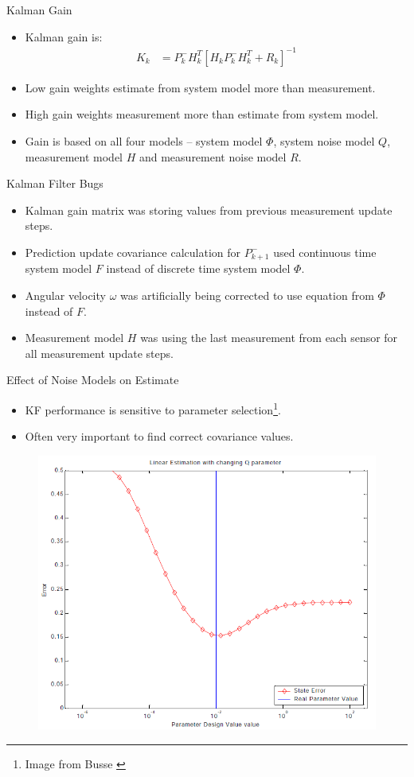 \documentclass[hyperref={pdfpagelabels=false}]{beamer}
\begin{document}
\begin{frame}{Kalman Gain}
\begin{itemize}
\item Kalman gain is:
\begin{align*}
K_k &= P_k^-H_k^T\left[H_kP_k^-H_k^T + R_k\right]^{-1}
\end{align*}
\item Low gain weights estimate from system model more than measurement.
\item High gain weights measurement more than estimate from system model.
\item Gain is based on all four models -- system model $\Phi$, system noise model $Q$, measurement model $H$ and measurement noise model $R$.
\end{itemize}
\end{frame}

\begin{frame}{Kalman Filter Bugs}
\begin{itemize}
\item Kalman gain matrix was storing values from previous measurement update steps.
\item Prediction update covariance calculation for $P_{k+1}^-$ used continuous time system model $F$ instead of discrete time system model $\Phi$.
\item Angular velocity $\omega$ was artificially being corrected to use equation from $\Phi$ instead of $F$.
\item Measurement model $H$ was using the last measurement from each sensor for all measurement update steps.
\end{itemize}
\end{frame}

\begin{frame}{Effect of Noise Models on Estimate}
\begin{itemize}
\item KF performance is sensitive to parameter selection\footnote{Image from Busse \cite{Busse03adaptiveEKF}}.
\item Often very important to find correct covariance values.
\end{itemize}
\begin{figure}[ht!]
	\centering
	\includegraphics[width=.7\textwidth]{images/adaptiveSensitivity}
\end{figure}
\end{frame}
\end{document}

